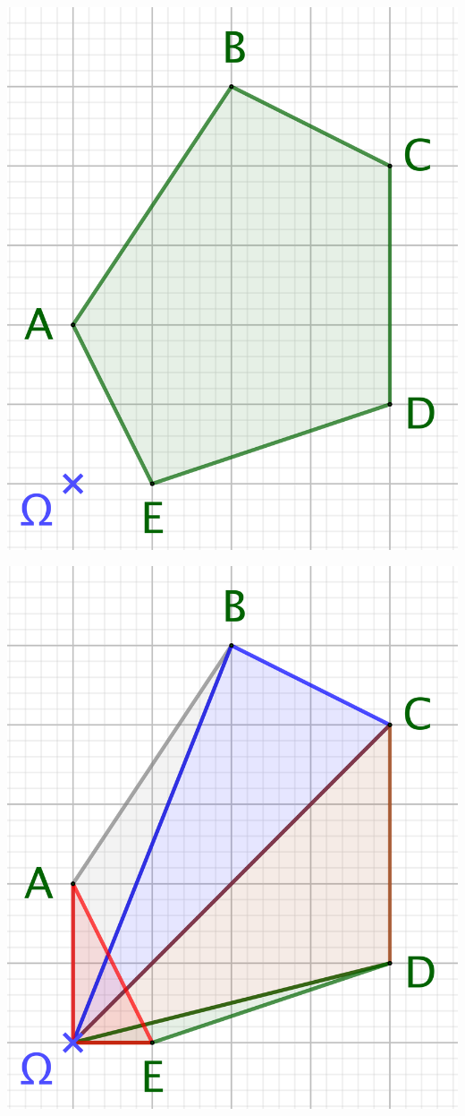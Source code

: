\begin{multicols}{2}
    \begin{center}
        \includegraphics[scale=.4]{content/polygon/sufficient-cond/convex-1.png}

        \includegraphics[scale=.4]{content/polygon/sufficient-cond/convex-2.png}
    \end{center}
\end{multicols}


